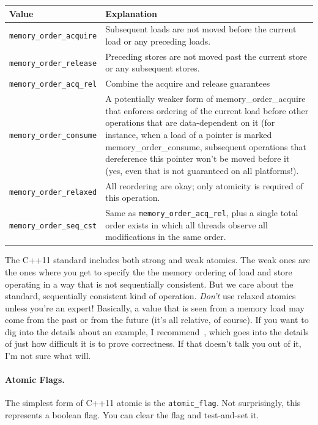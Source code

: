 \documentclass[a4paper]{report}
\begin{document}
\begin{center}
	\begin{tabular}{l|p{12cm}}
	\textbf{Value} & \textbf{Explanation} \\ \hline
		\texttt{memory\_order\_acquire} &  Subsequent loads are not moved before the current load or any preceding loads.\\ \hline
		\texttt{memory\_order\_release} &  Preceding stores are not moved past the current store or any subsequent stores. \\ \hline
		\texttt{memory\_order\_acq\_rel} & Combine the acquire and release guarantees\\ \hline
		\texttt{memory\_order\_consume} & A potentially weaker form of memory\_order\_acquire that enforces ordering of the current load before other operations that are data-dependent on it (for instance, when a load of a pointer is marked memory\_order\_consume, subsequent operations that dereference this pointer won't be moved before it (yes, even that is not guaranteed on all platforms!).\\ \hline
	
	\texttt{memory\_order\_relaxed} & All reordering are okay; only atomicity is required of this operation. \\ \hline
\texttt{memory\_order\_seq\_cst} & Same as \texttt{memory\_order\_acq\_rel}, plus a single total order exists in which all threads observe all modifications in the same order.\\ 
	\end{tabular}

\end{center}



The C++11 standard includes both strong and weak atomics. The weak ones are the ones where you get to specify the the memory ordering of load and store operating in a way that is not sequentially consistent. But we care about the standard, sequentially consistent kind of operation. \textit{Don't} use relaxed atomics unless you're an expert! Basically, a value that is seen from a memory load may come from the past or from the future (it's all relative, of course). If you want to dig into the details about an example, I recommend~\cite{bmref2}, which goes into the details of just how difficult it is to prove correctness. If that doesn't talk you out of it, I'm not sure what will.


\paragraph{Atomic Flags.} The simplest form of C++11 atomic is the {\tt atomic\_flag}.
Not surprisingly, this represents a boolean flag. You can clear the flag and test-and-set it.
\end{document}
